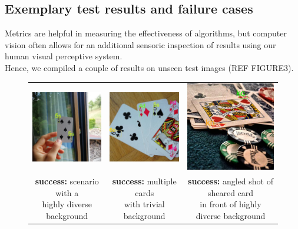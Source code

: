 \documentclass[a4paper]{article}
\begin{document}
\subsection*{Exemplary test results and failure cases}
Metrics are helpful in measuring the effectiveness of algorithms, but computer vision often allows for an additional sensoric inspection of results using our human visual perceptive system. \\Hence, we compiled a couple of results on unseen test images (REF FIGURE3).
\begin{figure}[h]

\begin{tabular}{ccc}

 \includegraphics[width=44mm]{success3} &   \includegraphics[width=44mm]{success2} &   \includegraphics[width=44mm]{success1}\\
\makecell{\textbf{success:} scenario with a \\ highly diverse background}  & \makecell{\textbf{success:}  multiple cards \\ with trivial background} & \makecell{\textbf{success:}  angled shot of sheared card \\ in front of highly diverse background}\\[6pt]

\end{tabular}
\end{figure}
\end{document}
